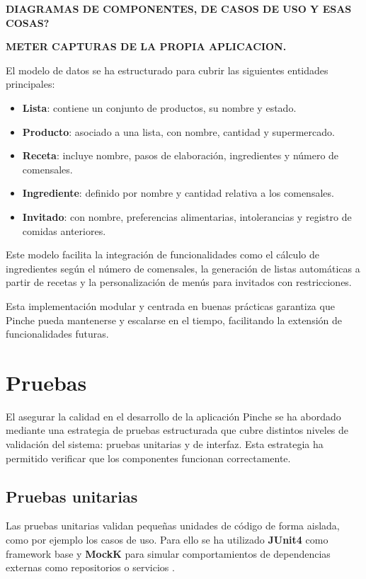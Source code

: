 \textbf{DIAGRAMAS DE COMPONENTES, DE CASOS DE USO Y ESAS COSAS?}

\textbf{METER CAPTURAS DE LA PROPIA APLICACION.}

El modelo de datos se ha estructurado para cubrir las siguientes entidades principales:

\begin{itemize}
    \item \textbf{Lista}: contiene un conjunto de productos, su nombre y estado.
    \item \textbf{Producto}: asociado a una lista, con nombre, cantidad y supermercado.
    \item \textbf{Receta}: incluye nombre, pasos de elaboración, ingredientes y número de comensales.
    \item \textbf{Ingrediente}: definido por nombre y cantidad relativa a los comensales.
    \item \textbf{Invitado}: con nombre, preferencias alimentarias, intolerancias y registro de comidas anteriores.
\end{itemize}

Este modelo facilita la integración de funcionalidades como el cálculo de ingredientes según el número de comensales, la generación de listas automáticas a partir de recetas y la personalización de menús para invitados con restricciones.


Esta implementación modular y centrada en buenas prácticas garantiza que Pinche pueda mantenerse y escalarse en el tiempo, facilitando la extensi\'on de funcionalidades futuras.

\section{Pruebas}
\label{sec:pruebas}

El asegurar la calidad en el desarrollo de la aplicación Pinche se ha abordado mediante una estrategia de pruebas estructurada que cubre distintos niveles de validación del sistema: pruebas unitarias y de interfaz. Esta estrategia ha permitido verificar que los componentes funcionan correctamente.

\subsection{Pruebas unitarias}

Las pruebas unitarias validan pequeñas unidades de código de forma aislada, como por ejemplo los casos de uso. Para ello se ha utilizado \textbf{JUnit4} como framework base y \textbf{MockK} para simular comportamientos de dependencias externas como repositorios o servicios \cite{android-testing}.

